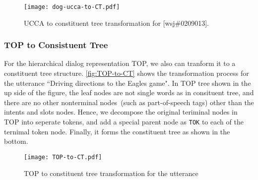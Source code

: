 \begin{figure}[!h]
\centering
\texttt{[image: dog-ucca-to-CT.pdf]}
\caption{\label{fig:ucca-to-CT} UCCA to constituent tree transformation for [wsj\#0209013].}
\end{figure}

\subsubsection{TOP to Consistuent Tree}
\label{sssec:phr:top-to-ct}
For the hierarchical dialog representation TOP, we also can tranform
it to a constituent tree structure. \autoref{fig:TOP-to-CT} shows the
transformation process for the utterance ``Driving directions to the
Eagles game". In TOP tree shown in the up side of the figure, the leaf
nodes are not single words as in consituent tree, and there are no
other nonterminal nodes~(such as part-of-speech tags) other than the
intents and slots nodes. Hence, we decompose the original teriminal
nodes in TOP into seperate tokens, and add a special parent node as
\texttt{TOK} to each of the ternimal token node. Finally, it forms the
constituent tree as shown in the bottom.
\begin{figure}[!h]
\centering
\texttt{[image: TOP-to-CT.pdf]}
\caption{\label{fig:TOP-to-CT} TOP to constituent tree transformation
  for the utterance }
\end{figure}

